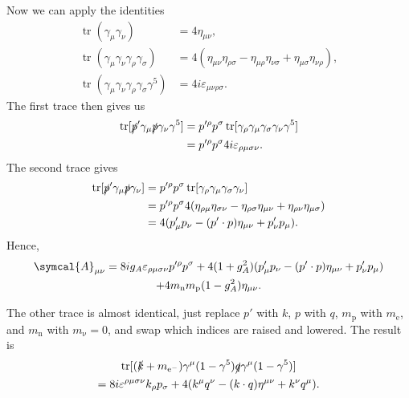 \documentclass[fleqn]{NotesClass}
\newcommand{\Pparticle}[1]{\mathrm{#1}}
\newcommand{\Pe}{\ensuremath{\Pparticle{e}^{-}}}
\newcommand{\Pex}{\ensuremath{\Pparticle{e}}}
\newcommand{\Pnu}{\ensuremath{\upnu}}
\newcommand{\Pp}{\ensuremath{\Pparticle{p}}}
\newcommand{\Pn}{\ensuremath{\Pparticle{n}}}
\newcommand{\amplitude}{\symcal{A}}
\newcommand{\minkowskiMetric}{\eta}
\DeclareMathOperator{\tr}{tr}
\begin{document}
    Now we can apply the identities
    \begin{align}
        \tr(\gamma_\mu \gamma_\nu) &= 4\minkowskiMetric_{\mu\nu},\\
        \tr(\gamma_\mu\gamma_\nu\gamma_\rho\gamma_\sigma) &= 4(\minkowskiMetric_{\mu\nu}\minkowskiMetric_{\rho\sigma} - \minkowskiMetric_{\mu\rho}\minkowskiMetric_{\nu\sigma} + \minkowskiMetric_{\mu\sigma}\minkowskiMetric_{\nu\rho}),\\
        \tr(\gamma_\mu\gamma_\nu\gamma_\rho\gamma_\sigma\gamma^5) &= 4i\varepsilon_{\mu\nu\rho\sigma}.
    \end{align}
    The first trace then gives us
    \begin{align}
        \tr[\slashed{p}' \gamma_\mu \slashed{p} \gamma_\nu \gamma^5] &= p'^\rho p^\sigma \tr[\gamma_\rho \gamma_\mu \gamma_\sigma \gamma_\nu \gamma^5]\\
        &= p'^\rho p^\sigma 4i\varepsilon_{\rho\mu\sigma\nu}.
    \end{align}
    The second trace gives
    \begin{align}
        \tr[\slashed{p}'\gamma_\mu\slashed{p}\gamma_\nu] &= p'^\rho p^\sigma \tr[\gamma_\rho \gamma_\mu \gamma_\sigma \gamma_\nu]\\
        &= p'^\rho p^\sigma4(\minkowskiMetric_{\rho\mu}\minkowskiMetric_{\sigma\nu} - \minkowskiMetric_{\rho\sigma}\minkowskiMetric_{\mu\nu} + \minkowskiMetric_{\rho\nu}\minkowskiMetric_{\mu\sigma})\\
        &= 4(p'_\mu p_\nu - (p' \cdot p)\minkowskiMetric_{\mu\nu} + p'_\nu p_\mu).
    \end{align}
    Hence,
    \begin{multline}
        \amplitude_{\mu\nu} = 8ig_A \varepsilon_{\rho\mu\sigma\nu}p'^\rho p^\sigma + 4(1 + g_A^2)(p'_\mu p_\nu - (p' \cdot p)\minkowskiMetric_{\mu\nu} + p'_\nu p_\mu)\\
        + 4m_{\Pn}m_{\Pp}(1 - g_A^2)\minkowskiMetric_{\mu\nu}.
    \end{multline}
    
    The other trace is almost identical, just replace \(p'\) with \(k\), \(p\) with \(q\), \(m_{\Pp}\) with \(m_{\Pex}\), and \(m_{\Pn}\) with \(m_{\Pnu} = 0\), and swap which indices are raised and lowered.
    The result is
    \begin{multline}
        \tr[(\slashed{k} + m_{\Pe})\gamma^\mu(1 - \gamma^5)\slashed{q}\gamma^\mu(1 - \gamma^5)]\\
        = 8i\varepsilon^{\rho\mu\sigma\nu}k_\rho p_\sigma + 4(k^\mu q^\nu - (k \cdot q)\minkowskiMetric^{\mu\nu} + k^\nu q^\mu).
    \end{multline}
    
\end{document}
